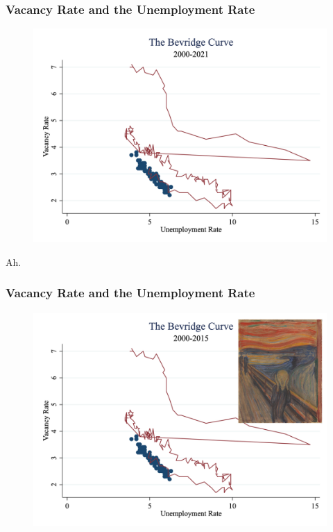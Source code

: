 \documentclass{beamer}
\begin{document}
\begin{frame}
\frametitle[alignment=center]{Vacancy Rate and the Unemployment Rate}
\begin{figure}
\centering
\includegraphics[scale=0.23]{Figures/Fig_6pt8_Updated.png}
\end{figure}
Ah.
\end{frame}

\begin{frame}
\frametitle[alignment=center]{Vacancy Rate and the Unemployment Rate}
\begin{figure}
\centering
\includegraphics[scale=0.25]{Figures/Fig_6pt8_Updated_Scream.png}
\end{figure}
\end{frame}
\end{document}
